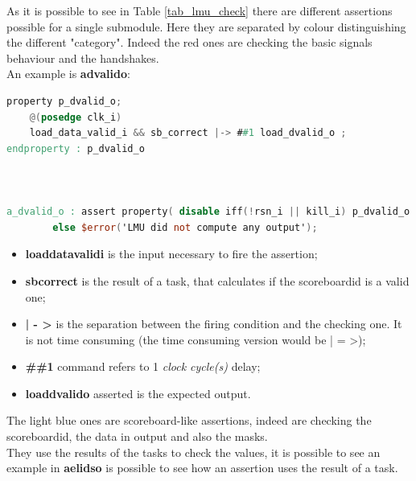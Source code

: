 As it is possible to see in Table \ref{tab_lmu_check} there are different assertions possible for a single submodule. 
Here they are separated by colour distinguishing the different "category".
Indeed the red ones are checking the basic signals behaviour and the handshakes.\\
An example is \textbf{a\+dvalid\+o}:
\bigskip

\linespread{1}

\begin{lstlisting}[language=Verilog,style=verilog-style, backgroundcolor=\color{lyel_palette}, frame=tlb]
property p_dvalid_o;
	@(posedge clk_i)
	load_data_valid_i && sb_correct |-> ##1 load_dvalid_o ;
endproperty : p_dvalid_o



a_dvalid_o : assert property( disable iff(!rsn_i || kill_i) p_dvalid_o ) 
        else $error('LMU did not compute any output');

\end{lstlisting}
\linespread{1.2}
\bigskip
\begin{itemize}
    \item \textbf{load\+data\+valid\+i} is the input necessary to fire the assertion;
    
    \item \textbf{sb\+correct} is the result of a task, that calculates if the scoreboard\+id is a valid one;
    
    \item \textbf{| - >} is the separation between the firing condition and the checking one. It is not time consuming (the time consuming version would be | = >);
    
    \item \textbf{\#\#1} command refers to 1 \textit{clock cycle(s)} delay;
    
    \item \textbf{load\+dvalid\+o} asserted is the expected output.
\end{itemize}

The light blue ones are scoreboard-like assertions, indeed are checking the scoreboard\+id, the data in output and also the masks.\\
They use the results of the tasks to check the values, it is possible to see an example in \textbf{a\+el\+ids\+o} is possible to see how an assertion uses the result of a task.

